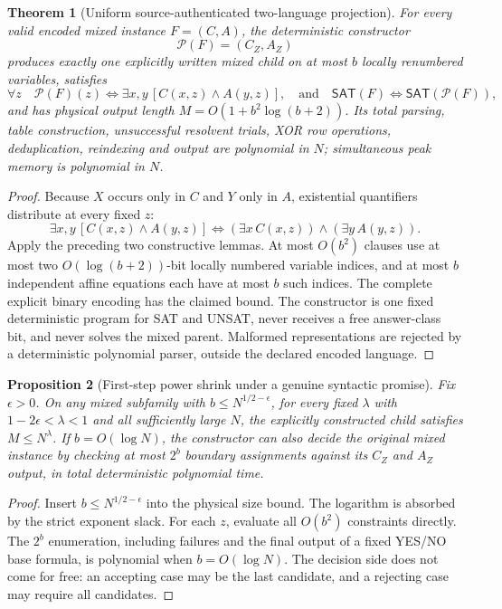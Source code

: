 \documentclass[11pt]{article}
\newtheorem{theorem}{Theorem}
\newtheorem{proposition}[theorem]{Proposition}
\newcommand{\SAT}{\mathsf{SAT}}
\begin{document}
\begin{theorem}[Uniform source-authenticated two-language projection]
For every valid encoded mixed instance $F=(C,A)$, the deterministic constructor
\[
 \mathcal P(F)=(C_Z,A_Z)
\]
produces \emph{exactly one} explicitly written mixed child on at most $b$ locally renumbered variables, satisfies
\[
 \forall z\quad \mathcal P(F)(z)\iff
   \exists x,y\,[C(x,z)\wedge A(y,z)],
\quad\text{and}\quad
 \SAT(F)\iff\SAT(\mathcal P(F)),
\]
and has physical output length $M=O(1+b^2\log(b+2))$. Its total parsing, table construction, unsuccessful resolvent trials, XOR row operations, deduplication, reindexing and output are polynomial in $N$; simultaneous peak memory is polynomial in $N$.
\end{theorem}
\begin{proof}
Because $X$ occurs only in $C$ and $Y$ only in $A$, existential quantifiers distribute at every fixed $z$:
\[
 \exists x,y\,[C(x,z)\wedge A(y,z)]
 \iff (\exists x\,C(x,z))\wedge(\exists y\,A(y,z)).
\]
Apply the preceding two constructive lemmas. At most $O(b^2)$ clauses use at most two $O(\log(b+2))$-bit locally numbered variable indices, and at most $b$ independent affine equations each have at most $b$ such indices. The complete explicit binary encoding has the claimed bound. The constructor is one fixed deterministic program for SAT and UNSAT, never receives a free answer-class bit, and never solves the mixed parent. Malformed representations are rejected by a deterministic polynomial parser, outside the declared encoded language.
\end{proof}

\begin{proposition}[First-step power shrink under a genuine syntactic promise]
Fix $\epsilon>0$. On any mixed subfamily with $b\le N^{1/2-\epsilon}$, for every fixed $\lambda$ with $1-2\epsilon<\lambda<1$ and all sufficiently large $N$, the explicitly constructed child satisfies $M\le N^\lambda$. If $b=O(\log N)$, the constructor can also decide the original mixed instance by checking at most $2^b$ boundary assignments against its $C_Z$ and $A_Z$ output, in total deterministic polynomial time.
\end{proposition}
\begin{proof}
Insert $b\le N^{1/2-\epsilon}$ into the physical size bound. The logarithm is absorbed by the strict exponent slack. For each $z$, evaluate all $O(b^2)$ constraints directly. The $2^b$ enumeration, including failures and the final output of a fixed YES/NO base formula, is polynomial when $b=O(\log N)$. The decision side does not come for free: an accepting case may be the last candidate, and a rejecting case may require all candidates.
\end{proof}
\end{document}
